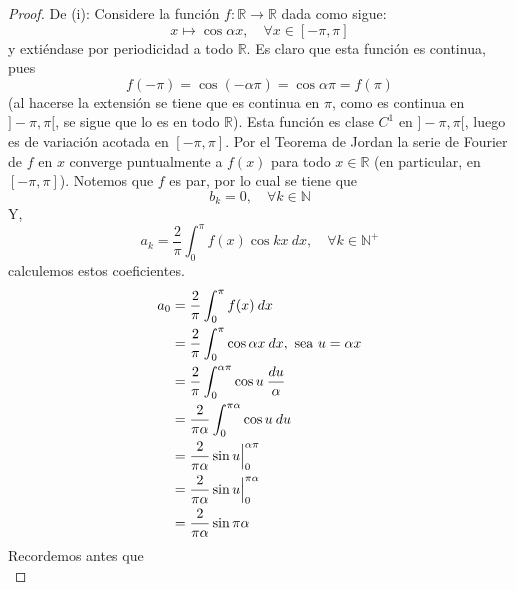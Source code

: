 \documentclass[12pt]{report}
\theoremstyle{largebreak}
\newcommand\cf[3]{\ensuremath{#1:#2\rightarrow#3}}
\begin{document}
    \begin{proof}
        De (i): Considere la función $\cf{f}{\mathbb{R}}{\mathbb{R}}$ dada como sigue:
        \begin{equation*}
            x\mapsto \cos\alpha x,\quad\forall x\in[-\pi,\pi]
        \end{equation*}
        y extiéndase por periodicidad a todo $\mathbb{R}$. Es claro que esta función es continua, pues
        \begin{equation*}
            f(-\pi)=\cos(-\alpha\pi)=\cos\alpha\pi=f(\pi)
        \end{equation*}
        (al hacerse la extensión se tiene que es continua en $\pi$, como es continua en $]-\pi,\pi[$, se sigue que lo es en todo $\mathbb{R}$). Esta función es clase $C^1$ en $]-\pi,\pi[$, luego es de variación acotada en $[-\pi,\pi]$. Por el Teorema de Jordan la serie de Fourier de $f$ en $x$ converge puntualmente a $f(x)$ para todo $x\in\mathbb{R}$ (en particular, en $[-\pi,\pi]$). Notemos que $f$ es par, por lo cual se tiene que
        \begin{equation*}
            b_k=0,\quad\forall k\in\mathbb{N}
        \end{equation*}
        Y,
        \begin{equation*}
            a_k=\frac{2}{\pi}\int_{0}^{\pi}f(x)\cos kx\:dx,\quad\forall k\in\mathbb{N}^+
        \end{equation*}
        calculemos estos coeficientes.
        \begin{equation*}
            \begin{split}
                a_0&=\frac{2}{\pi}\int_{0}^{\pi}f(x)\:dx\\
                &=\frac{2}{\pi}\int_{0}^{\pi}\cos\alpha x\:dx,\textup{  sea }u=\alpha x \\
                &=\frac{2}{\pi}\int_{0}^{\alpha\pi}\cos u\: \frac{du}{\alpha}\\
                &=\frac{2}{\pi\alpha}\int_{0}^{\pi\alpha}\cos u\:du\\
                &=\frac{2}{\pi\alpha}\sin u\Big|_{0}^{\alpha\pi}\\
                &=\frac{2}{\pi\alpha}\sin u\Big|_{0}^{\pi\alpha}\\
                &=\frac{2}{\pi\alpha}\sin\pi\alpha\\
            \end{split}
        \end{equation*}
        Recordemos antes que
        \begin{equation*}

\end{equation*}
\end{proof}
\end{document}
